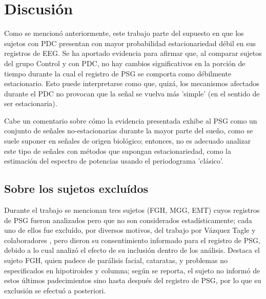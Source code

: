 \documentclass[12pt,a4paper]{mitthesis}
\begin{document}

\section{Discusi\'on}

Como se mencion\'o anteriormente, este trabajo parte del supuesto en que los
sujetos con PDC presentan con mayor probabilidad estacionariedad d\'ebil en sus registros de EEG.
Se ha aportado evidencia para afirmar que,
al comparar sujetos 
del grupo Control y con
PDC,
no hay cambios significativos en la porci\'on de tiempo 
durante la cual el registro de PSG se comporta como d\'ebilmente estacionario. 
Esto puede interpretarse como que, quiz\'a, los mecanismos afectados durante el PDC no 
provocan que la se\~nal se vuelva m\'as 'simple' (en el sentido de ser estacionaria).

Cabe un comentario sobre c\'omo la evidencia presentada exhibe al PSG como un conjunto de se\~nales 
no-estacionarias durante la mayor parte del sue\~no, como se suele suponer en se\~nales de
origen biol\'ogico; entonces, no es adecuado analizar este tipo de se\~nales 
con m\'etodos que supongan estacionariedad, como la estimaci\'on del espectro de potencias usando
el periodograma 'cl\'asico'. 


\subsection{Sobre los sujetos exclu\'idos}

Durante el trabajo se mencionan tres sujetos (FGH, MGG, EMT) cuyos registros de PSG 
fueron analizados pero que no son considerados estad\'isticamente; cada uno de ellos fue exclu\'ido, 
por diversos motivos, del trabajo por V\'azquez Tagle y colaboradores \cite{VazquezTagle16}, 
pero dieron su consentimiento 
informado para el registro de PSG, debido a lo cual analiz\'o el efecto de su 
inclusi\'on dentro de los an\'alisis.
Destaca el sujeto FGH, quien padece de par\'alisis facial, cataratas, y problemas 
no especificados en hipotiroides y columna; 
seg\'un se reporta, el sujeto no inform\'o de 
estos \'ultimos padecimientos sino hasta despu\'es del registro de PSG, por lo que su exclusi\'on 
se efectu\'o a posteriori.
\end{document}
